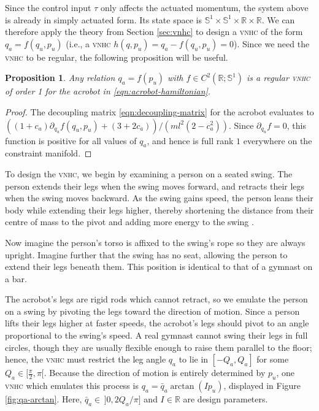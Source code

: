 \documentclass[journal,twoside,web, twocolumn,draftcls]{ieeecolor}
\newtheorem{prop}{Proposition} %
\newcommand*{\R}{\mathbb{R}}
\renewcommand*{\Re}{\mathbb{R}}
\newcommand*{\Sone}{\mathbb{S}^1}
\newcommand*{\vnhc}{\textsc{vnhc}\xspace}
\begin{document}
Since the control input \(\tau\) only affects the actuated momentum,
the system above is already in simply actuated form.
Its state space is \(\Sone \times \Sone \times \Re \times \Re\).
We can therefore apply the theory from Section \ref{sec:vnhc} to design
a \vnhc of the form \(q_a = f(q_u,p_u)\) (i.e., a \vnhc 
\(h(q,p_u) = q_a - f(q_u,p_u) = 0\)).
Since we need the \vnhc to be regular, the following proposition will be
useful.
\begin{prop}\label{prop:acrobot-fpu-regular}
    Any relation \(q_a = f(p_u)\) 
    with \(f \in C^2\left(\R; \Sone\right)\) is a regular
    \vnhc of order 1 for the acrobot in \eqref{eqn:acrobot-hamiltonian}.
\end{prop}
\begin{proof}
    The decoupling matrix \eqref{eqn:decoupling-matrix} for the acrobot
    evaluates to
    \(((1+c_a)\partial_{q_u}f(q_u,p_u) + (3+2c_a))/(ml^2(2-c_a^2))\).
    Since \(\partial_{q_u} f = 0\), this function is positive for all values
    of \(q_a\), and hence is full rank \(1\) everywhere on the constraint manifold.
\end{proof}

To design the \vnhc, we begin by examining a person on a
seated swing.
The person extends their legs when the swing moves forward, and retracts their
legs when the swing moves backward.
As the swing gains speed, the person leans their body while
extending their legs higher, thereby shortening the distance
from their centre of mass to the pivot and adding more energy to the swing
\cite{how_to_pump_a_swing}.

Now imagine the person's torso is affixed to the swing's rope so they are
always upright. 
Imagine further that the swing has no seat, allowing the person to extend
their legs beneath them. 
This position is identical to that of a gymnast on a bar.

The acrobot's legs are rigid rods which cannot retract, so we emulate the person
on a swing by pivoting the legs toward the direction of motion. 
Since a person lifts their legs higher at faster speeds, the acrobot's legs should
pivot to an angle proportional to the swing's speed.
A real gymnast cannot swing their legs in full circles, though they
are usually flexible enough to raise them parallel to the floor;
hence, the \vnhc must restrict the leg angle \(q_a\) 
to lie in \([-Q_a, Q_a]\) for some \(Q_a \in [\frac{\pi}{2}, \pi[\). 
Because the direction of motion is entirely determined by \(p_u\), 
one \vnhc which emulates this process is \(q_a = \bar{q}_a\arctan( I p_u)\),
displayed in Figure \ref{fig:qa-arctan}.
Here, \(\bar{q}_a \in \, ]0,2 Q_a/\pi]\) and \(I \in \R\) are 
design parameters.
\end{document}

